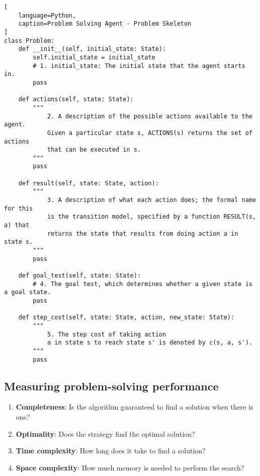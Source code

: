\begin{lstlisting}[
    language=Python,
    caption=Problem Solving Agent - Problem Skeleton
]
class Problem:
    def __init__(self, initial_state: State):
        self.initial_state = initial_state
        # 1. initial_state: The initial state that the agent starts in.
        pass

    def actions(self, state: State):
        """
            2. A description of the possible actions available to the agent. 
            Given a particular state s, ACTIONS(s) returns the set of actions 
            that can be executed in s.
        """
        pass

    def result(self, state: State, action):
        """
            3. A description of what each action does; the formal name for this 
            is the transition model, specified by a function RESULT(s, a) that 
            returns the state that results from doing action a in state s.
        """
        pass

    def goal_test(self, state: State):
        # 4. The goal test, which determines whether a given state is a goal state.
        pass

    def step_cost(self, state: State, action, new_state: State):
        """
            5. The step cost of taking action
            a in state s to reach state s' is denoted by c(s, a, s').
        """
        pass
\end{lstlisting}



\subsection{Measuring problem-solving performance}

\begin{enumerate}[itemsep=0.2cm]
    \item \textbf{Completeness}: Is the algorithm guaranteed to find a solution when there is one?
    \hfill \cite{ai/book/Artificial-Intelligence-A-Modern-Approach/Russell-Norvig}

    \item \textbf{Optimality}: Does the strategy find the optimal solution?
    \hfill \cite{ai/book/Artificial-Intelligence-A-Modern-Approach/Russell-Norvig}

    \item \textbf{Time complexity}: How long does it take to find a solution?
    \hfill \cite{ai/book/Artificial-Intelligence-A-Modern-Approach/Russell-Norvig}

    \item \textbf{Space complexity}: How much memory is needed to perform the search?
    \hfill \cite{ai/book/Artificial-Intelligence-A-Modern-Approach/Russell-Norvig}
\end{enumerate}


